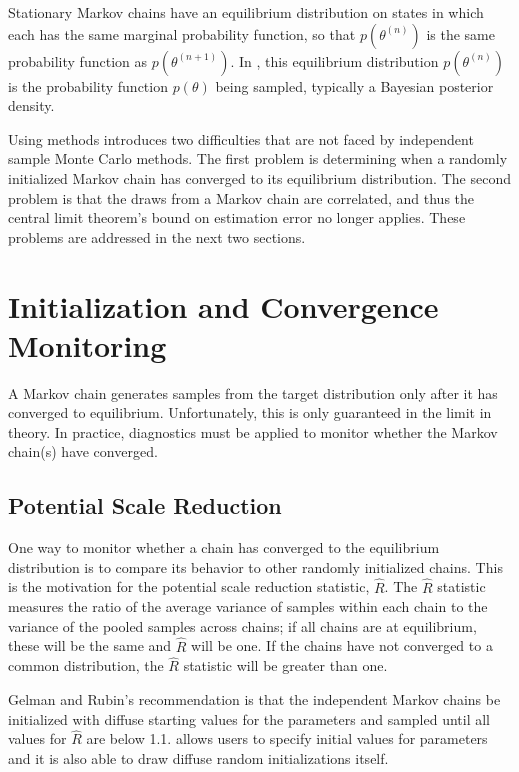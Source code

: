 Stationary Markov chains have an equilibrium distribution on states in
which each has the same marginal probability function, so that
$p(\theta^{(n)})$ is the same probability function as
$p(\theta^{(n+1)})$.  In \Stan, this equilibrium distribution
$p(\theta^{(n)})$ is the probability function $p(\theta)$ being
sampled, typically a Bayesian posterior density.

Using \MCMC methods introduces two difficulties that are not faced by
independent sample Monte Carlo methods.  The first problem is determining
when a randomly initialized Markov chain has converged to its
equilibrium distribution.  The second problem is that the draws from a
Markov chain are correlated, and thus the central limit theorem's
bound on estimation error no longer applies.  These problems are
addressed in the next two sections.


\section{Initialization and Convergence Monitoring}

A Markov chain generates samples from the target distribution only
after it has converged to equilibrium.  Unfortunately, this is only
guaranteed in the limit in theory.  In practice, diagnostics must be
applied to monitor whether the Markov chain(s) have converged.

\subsection{Potential Scale Reduction}

One way to monitor whether a chain has converged to the equilibrium
distribution is to compare its behavior to other randomly initialized
chains.  This is the motivation for the \cite{GelmanRubin:1992}
potential scale reduction statistic, $\hat{R}$.  The $\hat{R}$
statistic measures the ratio of the average variance of samples within
each chain to the variance of the pooled samples across chains; if all
chains are at equilibrium, these will be the same and $\hat{R}$ will
be one.  If the chains have not converged to a common distribution,
the $\hat{R}$ statistic will be greater than one.

Gelman and Rubin's recommendation is that the independent Markov
chains be initialized with diffuse starting values for the parameters
and sampled until all values for $\hat{R}$ are below 1.1.  \Stan
allows users to specify initial values for parameters and it is also
able to draw diffuse random initializations itself.

